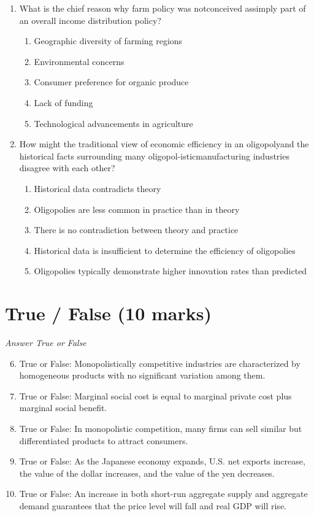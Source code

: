 \documentclass[12pt]{article}
\begin{document}
\begin{enumerate}[label=\arabic*.]
\begin{enumerate}[label=(\alph*)]
    \item value of other currencies will fall.
\end{enumerate}
\item What is the chief reason why farm policy was notconceived assimply part of an overall income distribution policy?
\begin{enumerate}[label=(\alph*)]
    \item Geographic diversity of farming regions
    \item Environmental concerns
    \item Consumer preference for organic produce
    \item Lack of funding
    \item Technological advancements in agriculture
\end{enumerate}
\item How might the traditional view of economic efficiency in an oligopolyand the historical facts surrounding many oligopol-isticmanufacturing industries disagree with each other?
\begin{enumerate}[label=(\alph*)]
    \item Historical data contradicts theory
    \item Oligopolies are less common in practice than in theory
    \item There is no contradiction between theory and practice
    \item Historical data is insufficient to determine the efficiency of oligopolies
    \item Oligopolies typically demonstrate higher innovation rates than predicted
\end{enumerate}
\end{enumerate}

\section*{True / False (10 marks)}
\textit{Answer True or False}
\begin{enumerate}[label=\arabic*.]
\setcounter{enumi}{5}
\item True or False: Monopolistically competitive industries are characterized by homogeneous products with no significant variation among them.
\item True or False: Marginal social cost is equal to marginal private cost plus marginal social benefit.
\item True or False: In monopolistic competition, many firms can sell similar but differentiated products to attract consumers.
\item True or False: As the Japanese economy expands, U.S. net exports increase, the value of the dollar increases, and the value of the yen decreases.
\item True or False: An increase in both short-run aggregate supply and aggregate demand guarantees that the price level will fall and real GDP will rise.
\end{enumerate}
\end{document}
